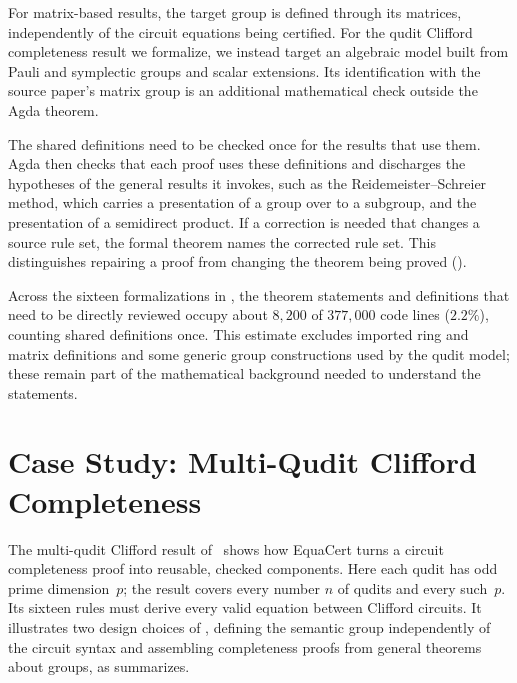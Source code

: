 \documentclass[acmsmall,screen,nonacm]{acmart}
\begin{document}
For matrix-based results, the target group is defined through its
matrices, independently of the circuit equations being certified.
For the qudit Clifford completeness result we formalize,
we instead target an algebraic model
built from Pauli and symplectic groups and scalar extensions. Its
identification with the source paper's matrix group is an additional
mathematical check outside the Agda theorem.

The shared definitions need to be checked once for the results that
use them. Agda then checks that each proof uses these definitions and
discharges the hypotheses of the general results it invokes, such as
the Reidemeister--Schreier method, which carries a presentation of a group over to a subgroup, and the presentation of a
semidirect product. If a correction is needed that changes a source rule set, the
formal theorem names the corrected rule set. This distinguishes repairing
a proof from changing the theorem being proved ().


Across the sixteen formalizations in , the theorem
statements and definitions that need to be directly reviewed occupy about
$8{,}200$ of $377{,}000$ code lines ($2.2\%$), counting shared
definitions once. This estimate excludes imported ring and matrix
definitions and some generic group constructions used by the qudit
model; these remain part of the mathematical background needed to
understand the statements.


\iffalse

\section{Case Study: Multi-Qudit Clifford Completeness}\label{sec:qudit-case-study}

The multi-qudit Clifford result of~\quditcite{} shows how EquaCert turns a circuit completeness proof into reusable, checked components. Here each qudit has odd prime dimension~$p$; the result covers every number $n$ of qudits and every such~$p$. Its sixteen rules must derive every valid equation between Clifford circuits. It illustrates two design choices of , defining the semantic group independently of the circuit syntax and assembling completeness proofs from general theorems about groups, as  summarizes.
\end{document}
